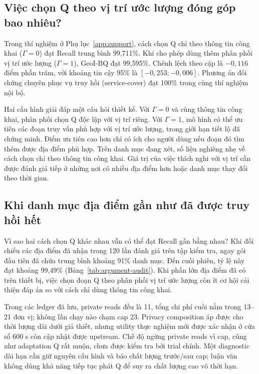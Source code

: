 \subsection{Việc chọn Q theo vị trí ước lượng đóng góp bao nhiêu?}\label{sec:belief-attribution}
Trong thí nghiệm ở Phụ lục~\ref{app:support}, cách chọn Q chỉ theo thông tin công khai ($\Gamma=0$) đạt Recall trung bình 99,711\%. Khi cho phép dùng thêm phân phối vị trí ước lượng ($\Gamma=1$), GeoI-BQ đạt 99,595\%. Chênh lệch theo cặp là $-0{,}116$ điểm phần trăm, với khoảng tin cậy 95\% là $[-0{,}253;-0{,}006]$. Phương án đối chứng chuyên phục vụ truy hồi (service-cover) đạt 100\% trong cùng thí nghiệm nội bộ.

Hai cấu hình giải đáp một câu hỏi thiết kế. Với $\Gamma=0$ và cùng thông tin công khai, phân phối chọn Q độc lập với vị trí riêng. Với $\Gamma=1$, mô hình có thể ưu tiên các đoạn truy vấn phù hợp với vị trí ước lượng, trong giới hạn tiết lộ đã chứng minh. Điểm ưu tiên cao hơn chỉ có ích cho người dùng nếu đoạn đó tìm thêm được địa điểm phù hợp. Trên danh mục đang xét, số liệu nghiêng nhẹ về cách chọn chỉ theo thông tin công khai. Giá trị của việc thích nghi với vị trí cần được đánh giá tiếp ở những nơi có nhiều địa điểm hơn hoặc danh mục thay đổi theo thời gian.

\subsection{Khi danh mục địa điểm gần như đã được truy hồi hết}\label{sec:argument-audit}
Vì sao hai cách chọn Q khác nhau vẫn có thể đạt Recall gần bằng nhau? Khi đối chiếu các địa điểm đã nhận trong 120 lần đánh giá trên tập kiểm tra, ngay gói đầu tiên đã chứa trung bình khoảng 91\% danh mục. Đến cuối phiên, tỷ lệ này đạt khoảng 99,49\% (Bảng~\ref{tab:argument-audit}). Khi phần lớn địa điểm đã có trên thiết bị, việc chọn đoạn Q theo phân phối vị trí ước lượng còn ít cơ hội cải thiện đáp án so với cách chỉ dùng thông tin công khai.



Trong các ledger đã lưu, private reads đều là 11, tổng chi phí cuối nằm trong 13--21 đơn vị;
không lần chạy nào chạm cap 23. Privacy composition áp được cho thời lượng dài dưới giả thiết,
nhưng utility thực nghiệm mới được xác nhận ở cửa sổ 600 s còn cập nhật được upstream. Chế độ
ngừng private reads vì cap, cũng như adaptation Q rất muộn, chưa được kiểm tra bởi trial chính.
Một diagnostic dài hạn cần giữ nguyên cấu hình và báo chất lượng trước/sau cap; luận văn không
dùng khả năng tiếp tục phát Q để suy ra chất lượng cao vô thời hạn.

